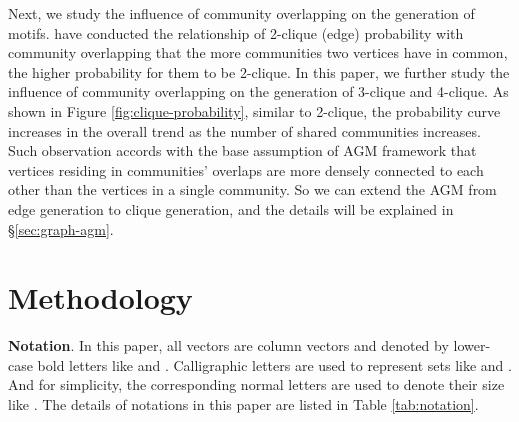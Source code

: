 \documentclass[sigconf]{acmart}
\begin{document}
Next, we study the influence of community overlapping on the generation of motifs.
\citet{yang2013overlapping} have conducted the relationship of 2-clique (edge) probability with community overlapping that the more communities two vertices have in common, the higher probability for them to be 2-clique.
In this paper, we further study the influence of community overlapping on the generation of 3-clique and 4-clique.
As shown in Figure \ref{fig:clique-probability}, similar to 2-clique, the probability curve increases in the overall trend as the number of shared communities increases.
Such observation accords with the base assumption of AGM framework that vertices residing in communities' overlaps are more densely connected to each other than the vertices in a single community.
So we can extend the AGM from edge generation to clique generation, and the details will be explained in \S \ref{sec:graph-agm}.


\section{Methodology}

\textbf{Notation}. 
In this paper, all vectors are column vectors and denoted by lower-case bold letters like  and . 
Calligraphic letters are used to represent sets like  and . 
And for simplicity, the corresponding normal letters are used to denote their size like . 
The details of notations in this paper are listed in Table \ref{tab:notation}.
\end{document}
